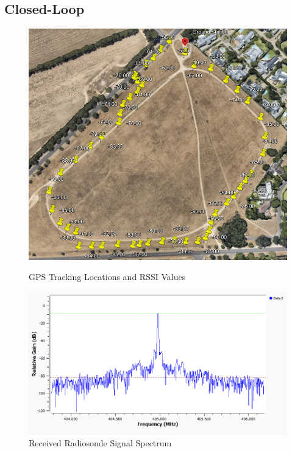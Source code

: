 \subsection{Closed-Loop}\label{sec:closed_loop_testing}
\begin{figure}[!tb]
  \begin{minipage}{.49\textwidth}
    \centering
    \includegraphics[width=0.95\linewidth]{gpsTrackingMap}
    \caption{GPS Tracking Locations and RSSI Values}
    \label{fig:gpsTrackingMap}
  \end{minipage}
  \begin{minipage}{.49\textwidth}
    \centering
    \includegraphics[width=1.0\linewidth]{radiosondeSpectrum}
    \caption{Received Radiosonde Signal Spectrum}
    \label{fig:radiosondeSpectrum}
  \end{minipage}
\end{figure}

